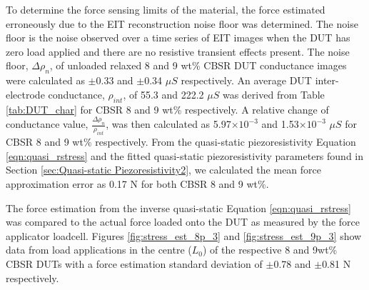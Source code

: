 To determine the force sensing limits of the material, the force estimated erroneously due to the EIT reconstruction noise floor was determined. The noise floor is the noise observed over a time series of EIT images when the DUT has zero load applied and there are no resistive transient effects present. The noise floor, $\Delta\rho_n$, of unloaded relaxed 8 and 9 wt\% CBSR DUT conductance images were calculated as $\pm$0.33 and $\pm$0.34 $\mu S$ respectively. An average DUT inter-electrode conductance, $\rho_{int}$, of 55.3 and 222.2 $\mu S$ was derived from Table \ref{tab:DUT_char} for CBSR 8 and 9 wt\% respectively. A relative change of conductance value, $\frac{\Delta\rho_{n}}{\rho_{int}}$, was then calculated as 5.97$\times10^{-3}$ and 1.53$\times10^{-3}$ $\mu S$ for CBSR 8 and 9 wt\% respectively. From the quasi-static piezoresistivity Equation \ref{eqn:quasi_rstress} and the fitted quasi-static piezoresistivity parameters found in Section \ref{sec:Quasi-static Piezoresistivity2}, we calculated the mean force approximation error as 0.17 N for both CBSR 8 and 9 wt\%.

The force estimation from the inverse quasi-static Equation \ref{eqn:quasi_rstress} was compared to the actual force loaded onto the DUT as measured by the force applicator loadcell. Figures \ref{fig:stress_est_8p_3} and \ref{fig:stress_est_9p_3} show data from load applications in the centre ($L_0$) of the respective 8 and 9wt\% CBSR DUTs with a force estimation standard deviation of $\pm$0.78 and $\pm$0.81 N respectively.

